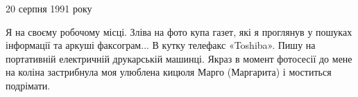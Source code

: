  
 
 
 
 


20 серпня 1991 року

Я на своєму робочому місці. Зліва на фото купа газет, які я проглянув у пошуках
інформації та аркуші факсограм... В кутку телефакс «Toshiba». Пишу на портативній
електричній друкарській машинці. Якраз в момент фотосесії до мене на коліна
застрибнула моя улюблена кицюля Марго (Маргарита) і моститься подрімати.
